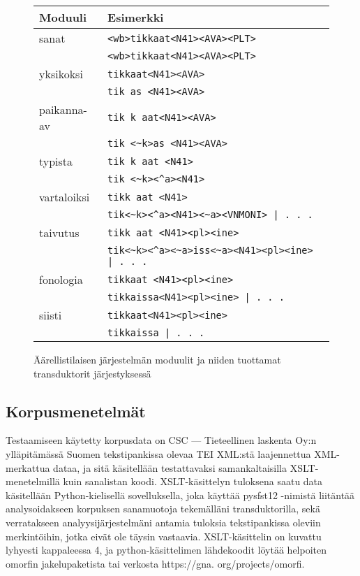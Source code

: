 \documentclass[free]{flammie}
\begin{document}
\begin{figure}
    \caption{Äärellistilaisen järjestelmän moduulit ja niiden tuottamat
    transduktorit
    järjestyksessä}
    \begin{tabular}{|l|l|}
        \hline
        \bf Moduuli & \bf Esimerkki \\
        \hline
        sanat & \verb|<wb>tikkaat<N41><AVA><PLT>| \\
        & \verb|<wb>tikkaat<N41><AVA><PLT>| \\
        \hline
        yksikoksi & \verb|tikkaat<N41><AVA>| \\
        & \verb|tik as <N41><AVA>| \\
        \hline
        paikanna-av & \verb|tik k aat<N41><AVA>| \\
        & \verb|tik <~k>as <N41><AVA>| \\
        \hline
        typista & \verb|tik k aat <N41>| \\
        & \verb|tik <~k><^a><N41>| \\
        \hline
        vartaloiksi & \verb|tikk aat <N41>| \\
        & \verb_tik<~k><^a><N41><~a><VNMONI> | . . ._ \\
        \hline
        taivutus & \verb|tikk aat <N41><pl><ine>| \\
        & \verb_tik<~k><^a><~a>iss<~a><N41><pl><ine> | . . ._ \\
        \hline
        fonologia & \verb|tikkaat <N41><pl><ine>| \\
        & \verb_tikkaissa<N41><pl><ine> | . . ._ \\
        \hline
        siisti & \verb_tikkaat<N41><pl><ine>_ \\
        & \verb_tikkaissa | . . ._ \\
        \hline
    \end{tabular}
\end{figure}


\subsection{Korpusmenetelmät}

Testaamiseen käytetty korpusdata on CSC — Tieteellinen laskenta Oy:n ylläpitämässä Suomen tekstipankissa olevaa TEI XML:stä laajennettua XML-merkattua
dataa, ja sitä käsitellään testattavaksi samankaltaisilla XSLT-menetelmillä kuin sanalistan koodi. XSLT-käsittelyn tuloksena saatu data käsitellään Python-kielisellä
sovelluksella, joka käyttää pysfst12 -nimistä liitäntää analysoidakseen korpuksen
sanamuotoja tekemälläni transduktorilla, sekä verratakseen analyysijärjestelmäni
antamia tuloksia tekstipankissa oleviin merkintöihin, jotka eivät ole täysin vastaavia. XSLT-käsittelin on kuvattu lyhyesti kappaleessa 4, ja python-käsittelimen lähdekoodit löytää helpoiten omorfin jakelupaketista tai verkosta https://gna.
org/projects/omorfi.
\end{document}
